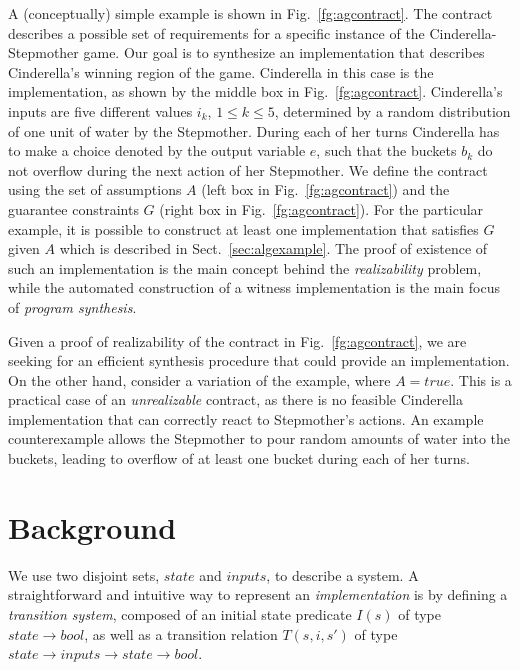 A (conceptually) simple example is shown in Fig.~\ref{fg:agcontract}. The contract describes a possible set of requirements for a specific instance of the Cinderella-Stepmother game. %
Our goal is to synthesize an implementation that describes Cinderella's winning region of the game. Cinderella in this case is the implementation, as shown by the middle box in Fig.~\ref{fg:agcontract}. Cinderella's inputs are five different values $i_k$, $1 \leq k \leq 5$, determined by a random distribution of one unit of water by the Stepmother. During each of her turns Cinderella has to make a choice denoted by the output variable $e$, such that the buckets $b_k$ do not overflow during the next action of her Stepmother. We define the contract using the set of assumptions $A$ (left box in Fig.~\ref{fg:agcontract}) and the guarantee constraints $G$ (right box in Fig.~\ref{fg:agcontract}). For the particular example, it is possible to construct at least one implementation that satisfies $G$ given $A$ which is described in Sect.~\ref{sec:algexample}.
The proof of existence of such an implementation is the main concept behind the \emph{realizability} problem, while the automated construction of a witness implementation is the main focus of \emph{program synthesis}.

Given a proof of realizability of the contract in Fig.~\ref{fg:agcontract}, %
we are seeking for an efficient synthesis procedure that could provide an implementation.
On the other hand, consider a variation of the example, where $A = \mathit{true}$. This is a practical case of an
\emph{unrealizable} contract, as there is no feasible Cinderella implementation that can correctly react to Stepmother's actions. An example counterexample allows the Stepmother to pour random amounts of water into the buckets, leading to overflow of at least one bucket during each of her turns.

\section{Background}
\label{sec:background}
We use two disjoint sets, $state$ and $inputs$, to describe a system.
A straightforward and intuitive way to represent an \emph{implementation} is by
defining a \emph{transition system}, composed of an initial state
predicate $I(s)$ of type $state \to bool$, as well as a transition relation
$T(s,i,s')$ of type $state \to inputs \to state \to bool$.

